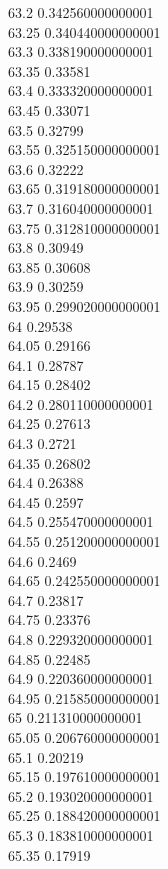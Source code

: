 {63.2	0.342560000000001\\
63.25	0.340440000000001\\
63.3	0.338190000000001\\
63.35	0.33581\\
63.4	0.333320000000001\\
63.45	0.33071\\
63.5	0.32799\\
63.55	0.325150000000001\\
63.6	0.32222\\
63.65	0.319180000000001\\
63.7	0.316040000000001\\
63.75	0.312810000000001\\
63.8	0.30949\\
63.85	0.30608\\
63.9	0.30259\\
63.95	0.299020000000001\\
64	0.29538\\
64.05	0.29166\\
64.1	0.28787\\
64.15	0.28402\\
64.2	0.280110000000001\\
64.25	0.27613\\
64.3	0.2721\\
64.35	0.26802\\
64.4	0.26388\\
64.45	0.2597\\
64.5	0.255470000000001\\
64.55	0.251200000000001\\
64.6	0.2469\\
64.65	0.242550000000001\\
64.7	0.23817\\
64.75	0.23376\\
64.8	0.229320000000001\\
64.85	0.22485\\
64.9	0.220360000000001\\
64.95	0.215850000000001\\
65	0.211310000000001\\
65.05	0.206760000000001\\
65.1	0.20219\\
65.15	0.197610000000001\\
65.2	0.193020000000001\\
65.25	0.188420000000001\\
65.3	0.183810000000001\\
65.35	0.17919\\
}
